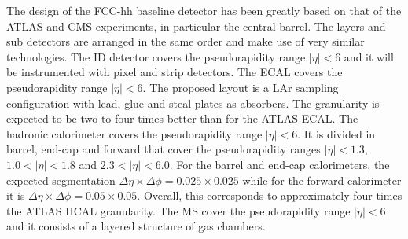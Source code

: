 The design of the FCC-hh baseline detector has been greatly based on that of the ATLAS and CMS experiments, in particular the central barrel. The layers and sub detectors are arranged in the same order and make use of very similar technologies. The ID detector covers the pseudorapidity range $|\eta|<6$ and it will be instrumented with pixel and strip detectors. The ECAL covers the pseudorapidity range $|\eta|<6$. The proposed layout is a LAr sampling configuration with lead, glue and steal plates as absorbers. The granularity is expected to be two to four times better than for the ATLAS ECAL. The hadronic calorimeter covers the pseudorapidity range $|\eta| < 6$. It is divided in barrel, end-cap and forward that cover the pseudorapidity ranges $|\eta| < 1.3$, $1.0 < |\eta| < 1.8$ and $2.3 < |\eta| < 6.0$. For the barrel and end-cap calorimeters, the expected segmentation $\Delta\eta\times\Delta\phi = 0.025 \times 0.025$ while for the forward calorimeter it is $\Delta\eta\times\Delta\phi = 0.05 \times 0.05$. Overall, this corresponds to approximately four times the ATLAS HCAL granularity. The MS cover the pseudorapidity range $|\eta|<6$ and it consists of a layered structure of gas chambers.